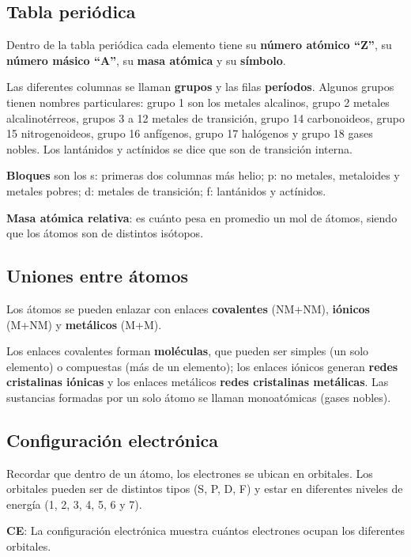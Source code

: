 \subsection*{Tabla periódica}

Dentro de la tabla periódica cada elemento tiene su \textbf{número atómico ``Z''}, su \textbf{número másico ``A''}, su \textbf{masa atómica} y su \textbf{símbolo}. 

\sskip
Las diferentes columnas se llaman \textbf{grupos} y las filas \textbf{períodos}.
Algunos grupos tienen nombres particulares: grupo 1 son los metales alcalinos, grupo 2 metales alcalinotérreos, grupos 3 a 12 metales de transición, grupo 14 carbonoideos, grupo 15 nitrogenoideos, grupo 16 anfígenos,  grupo 17 halógenos y grupo 18 gases nobles. Los lantánidos y actínidos se dice que son de transición interna.

\sskip
\textbf{Bloques} son los s: primeras dos columnas más helio; p: no metales, metaloides y metales pobres; d: metales de transición; f: lantánidos y actínidos.

\sskip
\textbf{Masa atómica relativa}: es cuánto pesa en promedio un mol de átomos, siendo que los átomos son de distintos isótopos.

\subsection*{Uniones entre átomos}

Los átomos se pueden enlazar con enlaces \textbf{covalentes} (NM+NM), \textbf{iónicos} (M+NM) y \textbf{metálicos} (M+M). 

\sskip 
Los enlaces covalentes forman \textbf{moléculas}, que pueden ser simples (un solo elemento) o compuestas (más de un elemento); los enlaces iónicos generan \textbf{redes cristalinas iónicas} y los enlaces metálicos \textbf{redes cristalinas metálicas}. Las sustancias formadas por un solo átomo se llaman monoatómicas (gases nobles).

\subsection*{Configuración electrónica}

Recordar que dentro de un átomo, los electrones se ubican en orbitales. Los orbitales pueden ser de distintos tipos (S, P, D, F) y estar en diferentes niveles de energía (1, 2, 3, 4, 5, 6 y 7).

\sskip
\textbf{CE}: La configuración electrónica muestra cuántos electrones ocupan los diferentes orbitales.


